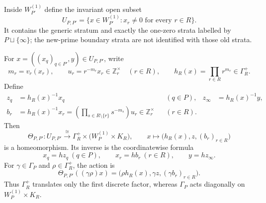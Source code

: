 Inside $W_{P'}^{(1)}$ define the invariant open subset
\begin{equation}
 U_{P,P'}=\{x\in W_{P'}^{(1)}:x_r\ne0\text{ for every }r\in R\}.
 \label{eq:coherence-old-boundary-sector}
\end{equation}
It contains the generic stratum and exactly the one-zero strata labelled by
$P\sqcup\{\infty\}$; the new-prime boundary strata are not identified with
those old strata.

\begin{theorem}
\label{thm:coherence-sector-homeomorphism}
For $x=((x_q)_{q\in P'},y)\in U_{P,P'}$, write
\[
 m_r=v_r(x_r),\qquad u_r=r^{-m_r}x_r\in\mathbb Z_r^\times
 \quad(r\in R),
 \qquad h_R(x)=\prod_{r\in R}r^{m_r}\in\Gamma_R^+.
\]
Define
\begin{align}
 z_q&=h_R(x)^{-1}x_q &&(q\in P),
 &z_\infty&=h_R(x)^{-1}y,
 \label{eq:coherence-old-coordinate}\\
 b_r&=h_R(x)^{-1}x_r
 =\left(\prod_{s\in R\setminus\{r\}}s^{-m_s}\right)u_r
 \in\mathbb Z_r^\times &&(r\in R).
 \label{eq:coherence-new-unit-coordinate}
\end{align}
Then
\begin{equation}
 \Theta_{P,P'}:U_{P,P'}\xrightarrow{\ \cong\ }
 \Gamma_R^+\times\bigl(W_P^{(1)}\times K_R\bigr),
 \qquad x\longmapsto\bigl(h_R(x),z,(b_r)_{r\in R}\bigr)
 \label{eq:coherence-sector-homeomorphism}
\end{equation}
is a homeomorphism.  Its inverse is the coordinatewise formula
\begin{equation}
 x_q=h z_q\ (q\in P),\qquad
 x_r=h b_r\ (r\in R),\qquad y=h z_\infty.
 \label{eq:coherence-sector-homeomorphism-inverse}
\end{equation}
For $\gamma\in\Gamma_P$ and $\rho\in\Gamma_R^+$, the action is
\begin{equation}
 \Theta_{P,P'}((\gamma\rho)x)
 =\bigl(\rho h_R(x),\gamma z,(\gamma b_r)_{r\in R}\bigr).
 \label{eq:coherence-sector-action}
\end{equation}
Thus $\Gamma_R^+$ translates only the first discrete factor, whereas
$\Gamma_P$ acts diagonally on $W_P^{(1)}\times K_R$.
\end{theorem}

